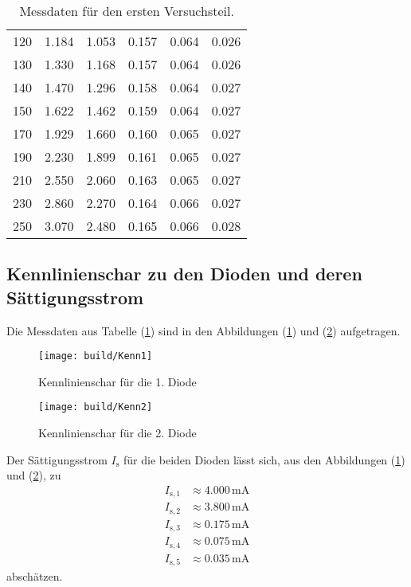 \begin{table}[H]
\begin{tabular}{c||c|c|c|c|c}
      120	& 1.184 & 1.053 & 0.157	& 0.064	& 0.026 \\
      130	& 1.330 & 1.168 & 0.157	& 0.064	& 0.026 \\
      140	& 1.470 & 1.296 & 0.158	& 0.064	& 0.027 \\
      150	& 1.622 & 1.462 & 0.159	& 0.064	& 0.027 \\
      170	& 1.929 & 1.660 & 0.160	& 0.065	& 0.027 \\
      190	& 2.230 & 1.899 & 0.161	& 0.065	& 0.027 \\
      210	& 2.550 & 2.060 & 0.163	& 0.065	& 0.027 \\
      230	& 2.860 & 2.270 & 0.164	& 0.066	& 0.027 \\
      250	& 3.070 & 2.480 & 0.165	& 0.066	& 0.028 \\
      \bottomrule
    \end{tabular}
    \caption{Messdaten für den ersten Versuchsteil.}
    \label{tab:Messdaten1}
  \end{table}

\subsection{Kennlinienschar zu den Dioden und deren Sättigungsstrom}
\label{sec:K}
Die Messdaten aus Tabelle (\ref{tab:Messdaten1}) sind in den Abbildungen (\ref{fig:Kenn1}) und (\ref{fig:Kenn2}) aufgetragen.

\begin{figure}[H] %
  \centering
  \texttt{[image: build/Kenn1]}
  \caption{Kennlinienschar für die 1. Diode}
  \label{fig:Kenn1}
\end{figure}

\begin{figure}[H] %
  \centering
  \texttt{[image: build/Kenn2]}
  \caption{Kennlinienschar für die 2. Diode}
  \label{fig:Kenn2}
\end{figure}

\newpage

Der Sättigungsstrom $I_\text{s}$ für die beiden Dioden lässt sich, aus den Abbildungen (\ref{fig:Kenn1}) und (\ref{fig:Kenn2}), zu
\begin{align*}
  I_{\text{s},1} & \approx 4.000 \, \text{mA} \\
  I_{\text{s},2} & \approx 3.800 \, \text{mA} \\
  I_{\text{s},3} & \approx 0.175 \, \text{mA} \\
  I_{\text{s},4} & \approx 0.075 \, \text{mA} \\
  I_{\text{s},5} & \approx 0.035 \, \text{mA}
\end{align*}
abschätzen.

